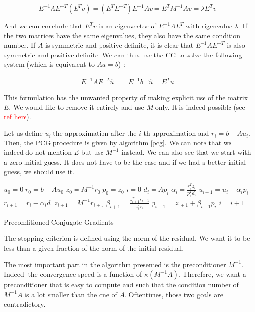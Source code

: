$$E^{-1}AE^{-T} (E^{T}v) = (E^{T}E^{-T})E^{-1}Av = E^{T}M^{-1}Av = \lambda E^Tv$$

And we can conclude that $E^Tv$ is an eigenvector of $E^{-1}AE^T$ with eigenvalue $\lambda$. If the two matrices have the same eigenvalues, they also have the same condition number. If $A$ is symmetric and positive-definite, it is clear that $E^{-1}AE^{-T}$ is also symmetric and positive-definite. We can thus use the CG to solve the following system (which is equivalent to $Au=b$) : 

\begin{align*}
E^{-1}AE^{-T} \hat{u} &= E^{-1}b &\hat{u} = E^{T}u
\end{align*}

This formulation has the unwanted property of making explicit use of the matrix $E$. We would like to remove it entirely and use $M$ only. It is indeed possible (see \textcolor{red}{ref here}).

Let us define $u_i$ the approximation after the $i$-th approximation and $r_i = b-Au_i$. Then, the PCG procedure is given by algorithm \ref{pcg}. We can note that we indeed do not mention $E$ but use $M^{-1}$ instead. We can also see that we start with a zero initial guess. It does not have to be the case and if we had a better initial guess, we should use it. 

\begin{algorithm}
\begin{algorithmic}
\State $u_0 = 0$
\State $r_0 = b-Au_0$
\State $z_0 = M^{-1}r_0$
\State $p_0 = z_0$
\State $i = 0$
\State $d_i = Ap_i$
\State $\alpha_i = \frac{r_i^Tz_i}{p^T_id_i}$
\State $u_{i+1} = u_i + \alpha_i p_i$
\State $r_{i+1} = r_i - \alpha_i d_i$
\State $z_{i+1} = M^{-1}r_{i+1}$
\State $\beta_{i+1} = \frac{z_{i+1}^Tr_{i+1}}{z_i^Tr_i}$
\State $ p_{i+1} = z_{i+1} + \beta_{i+1}p_i$
\State $i = i+1$
\EndWhile
\end{algorithmic}
\caption{Preconditioned Conjugate Gradients}
\label{pcg}
\end{algorithm}

The stopping criterion is defined using the norm of the residual. We want it to be less than a given fraction of the norm of the initial residual. 

The most important part in the algorithm presented is the preconditioner $M^{-1}$. Indeed, the convergence speed is a function of $\kappa(M^{-1}A)$. Therefore, we want a preconditioner that is easy to compute and such that the condition number of $M^{-1}A$ is a lot smaller than the one of $A$. Oftentimes, those two goals are contradictory. 


